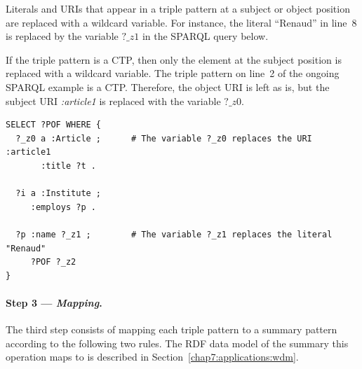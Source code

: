 Literals and URIs that appear in a triple pattern at a subject or object position are replaced with a wildcard variable.
For instance, the literal ``Renaud'' in line~8 is replaced by the variable $?\_z1$ in the SPARQL query below.

If the triple pattern is a CTP, then only the element at the subject position is replaced with a wildcard variable.
The triple pattern on line~2 of the ongoing SPARQL example is a CTP. Therefore, the object URI is left as is, but the subject URI \emph{:article1} is replaced with the variable $?\_z0$.

\begin{verbatim}
SELECT ?POF WHERE {
  ?_z0 a :Article ;      # The variable ?_z0 replaces the URI :article1
       :title ?t .
 
  ?i a :Institute ;
     :employs ?p .
 
  ?p :name ?_z1 ;        # The variable ?_z1 replaces the literal "Renaud"
     ?POF ?_z2
}
\end{verbatim}

\paragraph{Step 3 --- \emph{Mapping}.}

The third step consists of mapping each triple pattern to a summary pattern according to the following two rules.
The RDF data model of the summary this operation maps to is described in Section~\ref{chap7:applications:wdm}.

